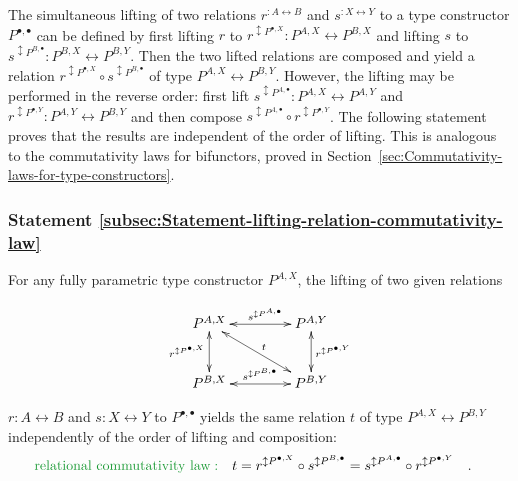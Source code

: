 The simultaneous lifting of two relations $r^{:A\leftrightarrow B}$
and $s^{:X\leftrightarrow Y}$ to a type constructor $P^{\bullet,\bullet}$
can be defined by first lifting $r$ to $r^{\updownarrow P^{\bullet,X}}:P^{A,X}\leftrightarrow P^{B,X}$
and lifting $s$ to $s^{\updownarrow P^{B,\bullet}}:P^{B,X}\leftrightarrow P^{B,Y}$.
Then the two lifted relations are composed and yield a relation $r^{\updownarrow P^{\bullet,X}}\circ s^{\updownarrow P^{B,\bullet}}$
of type $P^{A,X}\leftrightarrow P^{B,Y}$. However, the lifting may
be performed in the reverse order: first lift $s^{\updownarrow P^{A,\bullet}}:P^{A,X}\leftrightarrow P^{A,Y}$
and $r^{\updownarrow P^{\bullet,Y}}:P^{A,Y}\leftrightarrow P^{B,Y}$
and then compose $s^{\updownarrow P^{A,\bullet}}\circ r^{\updownarrow P^{\bullet,Y}}$.
The following statement proves that the results are independent of
the order of lifting. This is analogous to the commutativity laws
for bifunctors, proved in Section~\ref{sec:Commutativity-laws-for-type-constructors}.

\subsubsection{Statement \label{subsec:Statement-lifting-relation-commutativity-law}\ref{subsec:Statement-lifting-relation-commutativity-law}}

For  any fully parametric
type constructor $P^{A,X}$, the lifting of two given relations 

\begin{wrapfigure}{l}{0.28\columnwidth}%
\vspace{-2.1\baselineskip}
\[
\xymatrix{\xyScaleY{2.4pc}\xyScaleX{3.6pc}P^{A,X}\ar@{<->}[d]\sb(0.45){r^{\updownarrow P^{\bullet,X}}}\ar@{<->}[r]\sp(0.55){s^{\updownarrow P^{A,\bullet}}}\ar@{<->}[rd]\sp(0.5){t} & P^{A,Y}\ar@{<->}[d]\sp(0.45){r^{\updownarrow P^{\bullet,Y}}}\\
P^{B,X}\ar@{<->}[r]\sp(0.5){s^{\updownarrow P^{B,\bullet}}} & P^{B,Y}
}
\]

\vspace{-1.6\baselineskip}
\end{wrapfigure}%

\noindent $r:A\leftrightarrow B$ and $s:X\leftrightarrow Y$ to $P^{\bullet,\bullet}$
yields the same relation $t$ of type $P^{A,X}\leftrightarrow P^{B,Y}$
independently of the order of lifting and composition:
\begin{align*}
{\color{greenunder}\text{relational commutativity law}:}\quad & t=r^{\updownarrow P^{\bullet,X}}\circ s^{\updownarrow P^{B,\bullet}}=s^{\updownarrow P^{A,\bullet}}\circ r^{\updownarrow P^{\bullet,Y}}\quad.
\end{align*}


